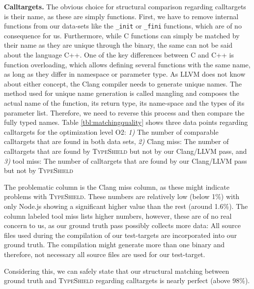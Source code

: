 \textbf{Calltargets.} The obvious choice for structural comparison regarding calltargets is their name, as these are simply functions. 
First, we have to remove internal functions from our data-sets like the \texttt{\_init} or \texttt{\_fini} functions, which are of no consequence for us. 
Furthermore, while C functions can simply be matched by their name as they are unique through the binary, the same can not be said about the 
language C++. One of the key differences between C and C++ is function overloading, which allows defining several functions with the same name, as 
long as they differ in namespace or parameter type. As LLVM does not know about either concept, the Clang compiler needs to generate unique names. 
The method used for unique name generation is called mangling and composes the actual name of the function, its return type, its name-space and the 
types of its parameter list. Therefore, we need to reverse this process and then compare the fully typed names.
Table \ref{tbl:matchingquality} shows three data points regarding calltargets for the optimization level O2:
\textit{1)}  The number of comparable calltargets that are found in both data sets, 
\textit{2)}  Clang miss: The number of calltargets that are found by \textsc{TypeShield} but not by our Clang/LLVM pass, and 
\textit{3)}  tool miss: The number of calltargets that are found by our Clang/LLVM pass but not by \textsc{TypeShield}

The problematic column is the Clang miss column, as these might indicate problems with \textsc{TypeShield}. These numbers are relatively low (below 1\%) with only Node.js showing a significant higher value than the rest (around 1.6\%). The column labeled tool miss lists 
higher numbers, however, these are of no real concern to us, as our ground truth pass possibly collects more data: All source files used during the 
compilation of our test-targets are incorporated into our ground truth. The compilation might generate more than one binary and therefore, not 
necessary all source files are used for our test-target.

Considering this, we can safely state that our structural matching between ground truth and \textsc{TypeShield} regarding calltargets is nearly
perfect (above 98\%).

